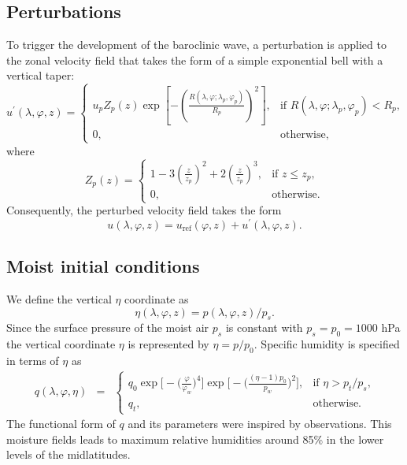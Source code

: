 \documentclass[times,doublespace]{fldauth}
\begin{document}
\subsection{Perturbations}

To trigger the development of the baroclinic wave, a perturbation is applied to the zonal velocity field that takes the form of a simple exponential bell with a vertical taper:
\begin{equation}
u^\prime(\lambda, \varphi, z) = \left\{ \begin{array}{ll} \displaystyle u_p Z_p(z)  \exp \left[ - \left( \frac{R(\lambda, \varphi; \lambda_p, \varphi_p)}{R_p} \right)^2 \right], & \mbox{if $R(\lambda, \varphi; \lambda_p, \varphi_p) < R_p$,} \\ 0, & \mbox{otherwise,} \end{array} \right.
\end{equation} where
\begin{equation}
Z_p(z) = \left\{ \begin{array}{ll} \displaystyle 1 - 3 \left( \frac{z}{z_p} \right)^2 + 2 \left( \frac{z}{z_p} \right)^3, & \mbox{if $z \leq z_p$,} \\ 0, & \mbox{otherwise.} \end{array} \right.
\end{equation}  Consequently, the perturbed velocity field takes the form
\begin{equation}
u(\lambda, \varphi, z) = u_{\text{ref}}(\varphi, z) + u^\prime(\lambda, \varphi, z).
\end{equation}

\subsection{Moist initial conditions}

We define the vertical $\eta$ coordinate as
\begin{equation}
\eta(\lambda, \varphi, z) = p(\lambda, \varphi, z) / p_s.
\end{equation}  Since the surface pressure of the moist air $p_s$ is constant with $p_s = p_0 = 1000$ hPa  the vertical coordinate $\eta$ is represented by $\eta = p/p_0$.  Specific humidity is specified in terms of $\eta$ as
\begin{eqnarray}
q(\lambda, \varphi, \eta) &=& \left\{ \begin{array}{ll} \displaystyle q_0 \exp\Bigg[- \Big(\frac{\varphi}{\varphi_{w}}\Big)^4 \Bigg] \exp\Bigg[- \Bigg(\frac{(\eta-1)p_0}{p_{w}}\Bigg)^2  \Bigg], & \mbox{if $\eta > p_t / p_s$,} \\ q_{t}, & \mbox{otherwise.} \end{array} \right.
\end{eqnarray} The functional form of $q$ and its parameters were inspired by observations. This moisture fields leads to maximum relative humidities around 85\% in the lower levels of the midlatitudes.
\end{document}

